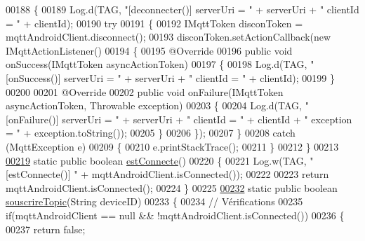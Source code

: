 \begin{DoxyCode}
00188     \{
00189         Log.d(TAG, \textcolor{stringliteral}{"[deconnecter()] serverUri = "} + serverUri + \textcolor{stringliteral}{" clientId = "} + clientId);
00190         \textcolor{keywordflow}{try}
00191         \{
00192             IMqttToken disconToken = mqttAndroidClient.disconnect();
00193             disconToken.setActionCallback(\textcolor{keyword}{new} IMqttActionListener()
00194             \{
00195                 @Override
00196                 \textcolor{keyword}{public} \textcolor{keywordtype}{void} onSuccess(IMqttToken asyncActionToken)
00197                 \{
00198                     Log.d(TAG, \textcolor{stringliteral}{"[onSuccess()] serverUri = "} + serverUri + \textcolor{stringliteral}{" clientId = "} + clientId);
00199                 \}
00200 
00201                 @Override
00202                 \textcolor{keyword}{public} \textcolor{keywordtype}{void} onFailure(IMqttToken asyncActionToken, Throwable exception)
00203                 \{
00204                     Log.d(TAG, \textcolor{stringliteral}{"[onFailure()] serverUri = "} + serverUri + \textcolor{stringliteral}{" clientId = "} + clientId + \textcolor{stringliteral}{"
       exception = "} + exception.toString());
00205                 \}
00206             \});
00207         \}
00208         \textcolor{keywordflow}{catch} (MqttException e)
00209         \{
00210             e.printStackTrace();
00211         \}
00212     \}
00213 
\hyperlink{classcom_1_1example_1_1bee__honeyt_1_1_communication_a155e0619c3d504750871a84e637bb808}{00219}     \textcolor{keyword}{static} \textcolor{keyword}{public} \textcolor{keywordtype}{boolean} \hyperlink{classcom_1_1example_1_1bee__honeyt_1_1_communication_a155e0619c3d504750871a84e637bb808}{estConnecte}()
00220     \{
00221         Log.w(TAG, \textcolor{stringliteral}{"[estConnecte()] "} + mqttAndroidClient.isConnected());
00222 
00223         \textcolor{keywordflow}{return} mqttAndroidClient.isConnected();
00224     \}
00225 
\hyperlink{classcom_1_1example_1_1bee__honeyt_1_1_communication_aa1093a3d4f3479595a36ef2425f3ef70}{00232}     \textcolor{keyword}{static} \textcolor{keyword}{public} \textcolor{keywordtype}{boolean} \hyperlink{classcom_1_1example_1_1bee__honeyt_1_1_communication_aa1093a3d4f3479595a36ef2425f3ef70}{souscrireTopic}(String deviceID)
00233     \{
00234         \textcolor{comment}{// Vérifications}
00235         \textcolor{keywordflow}{if}(mqttAndroidClient == null && !mqttAndroidClient.isConnected())
00236         \{
00237             \textcolor{keywordflow}{return} \textcolor{keyword}{false};

\end{DoxyCode}
